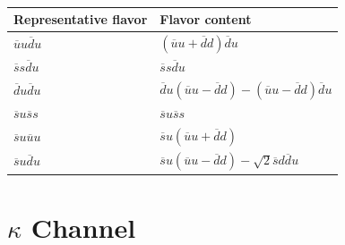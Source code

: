 \begin{table}
  \centering
  \begin{tabular}{|l|l|}
    \hline
    Representative flavor & Flavor content\\
    \hline
    $\overline u u \overline d u$ & $(\overline{u} u+\overline{d} d) \overline{d} u$\\
    $\overline s s \overline d u$ & $\overline s s \overline d u$\\
    $\overline d u \overline d u$ & $\overline{d} u(\overline{u} u-\overline{d} d)-(\overline{u} u-\overline{d} d) \overline{d} u$\\
    $\overline s u \overline s s$ & $\overline s u \overline s s$\\
    $\overline s u \overline u u$ & $\overline{s} u(\overline{u} u+\overline{d} d)$\\
    $\overline s u \overline d u$ & $\overline{s} u(\overline{u} u-\overline{d} d)-\sqrt{2} \overline{s} d \overline{d} u$\\
    \hline
  \end{tabular}
  \caption{}\label{table:flavor_structs}
\end{table}

\section{$\kappa$ Channel}
